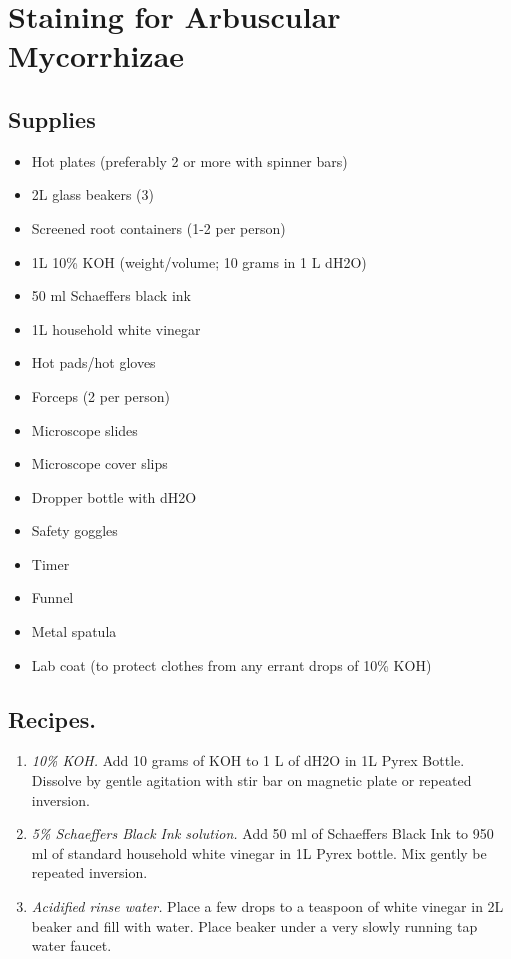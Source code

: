 \documentclass[]{book}
\providecommand{\tightlist}{%
  \setlength{\itemsep}{0pt}\setlength{\parskip}{0pt}}
\begin{document}
\hypertarget{staining-for-arbuscular-mycorrhizae}{%
\section{Staining for Arbuscular Mycorrhizae}\label{staining-for-arbuscular-mycorrhizae}}

\hypertarget{supplies-2}{%
\subsection{Supplies}\label{supplies-2}}

\begin{itemize}
\tightlist
\item
  Hot plates (preferably 2 or more with spinner bars)
\item
  2L glass beakers (3)
\item
  Screened root containers (1-2 per person)
\item
  1L 10\% KOH (weight/volume; 10 grams in 1 L dH2O)
\item
  50 ml Schaeffers black ink
\item
  1L household white vinegar
\item
  Hot pads/hot gloves
\item
  Forceps (2 per person)
\item
  Microscope slides
\item
  Microscope cover slips
\item
  Dropper bottle with dH2O
\item
  Safety goggles
\item
  Timer
\item
  Funnel
\item
  Metal spatula
\item
  Lab coat (to protect clothes from any errant drops of 10\% KOH)
\end{itemize}

\hypertarget{recipes.}{%
\subsection{Recipes.}\label{recipes.}}

\begin{enumerate}
\def\labelenumi{\arabic{enumi}.}
\tightlist
\item
  \emph{10\% KOH.} Add 10 grams of KOH to 1 L of dH2O in 1L Pyrex Bottle. Dissolve by gentle agitation with stir bar on magnetic plate or repeated inversion.
\item
  \emph{5\% Schaeffers Black Ink solution.} Add 50 ml of Schaeffers Black Ink to 950 ml of standard household white vinegar in 1L Pyrex bottle. Mix gently be repeated inversion.
\item
  \emph{Acidified rinse water.} Place a few drops to a teaspoon of white vinegar in 2L beaker and fill with water. Place beaker under a very slowly running tap water faucet.
\end{enumerate}
\end{document}
